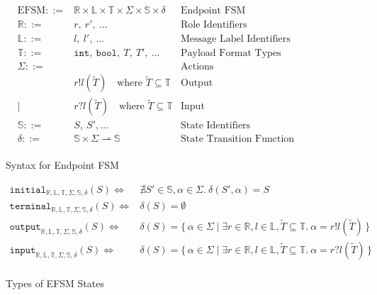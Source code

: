 \begin{figure}[!hb]
\doublespacing
\[
\begin{array}{rlr}

\text{EFSM} ::= & \mathbb{R} \times \mathbb{L} \times \mathbb{T} \times \Sigma \times \mathbb{S} \times \delta & \text{Endpoint FSM} \\

\mathbb{R} ::= & r,~r',~\dots & \text{Role Identifiers} \\

\mathbb{L} ::= & l,~l',~\dots & \text{Message Label Identifiers} \\

\mathbb{T} ::= & \texttt{int},~\texttt{bool},~T,~T',~\dots & \text{Payload Format Types} \\

\Sigma ::= & & \text{Actions} \\
     & r!l(\tilde{T}) \quad \text{where } \tilde{T} \subseteq \mathbb{T} & \text{Output} \\
\mid & r?l(\tilde{T}) \quad \text{where } \tilde{T} \subseteq \mathbb{T} & \text{Input} \\

\mathbb{S} ::= & S,~S',\dots & \text{State Identifiers} \\

\delta ::= & \mathbb{S} \times \Sigma \rightharpoonup \mathbb{S} & \text{State Transition Function} \\

\end{array}
\]
\singlespacing
\caption{Syntax for Endpoint FSM}
\end{figure}

\begin{figure}[!hb]
\doublespacing
\[
\begin{array}{rl}

\texttt{initial}_{\mathbb{R}, \mathbb{L}, \mathbb{T}, \Sigma, \mathbb{S}, \delta}(S) \iff & \nexists S' \in \mathbb{S},\alpha \in \Sigma.~\delta(S',\alpha) = S \\
\texttt{terminal}_{\mathbb{R}, \mathbb{L}, \mathbb{T}, \Sigma, \mathbb{S}, \delta}(S) \iff & \delta(S) = \emptyset \\
\texttt{output}_{\mathbb{R}, \mathbb{L}, \mathbb{T}, \Sigma, \mathbb{S}, \delta}(S) \iff & \delta(S) = \{\,\alpha \in \Sigma \mid \exists r \in \mathbb{R}, l \in \mathbb{L}, \tilde{T} \subseteq{\mathbb{T}}.~\alpha = r!l(\tilde{T})\,\} \\
\texttt{input}_{\mathbb{R}, \mathbb{L}, \mathbb{T}, \Sigma, \mathbb{S}, \delta}(S) \iff & \delta(S) = \{\,\alpha \in \Sigma \mid \exists r \in \mathbb{R}, l \in \mathbb{L}, \tilde{T} \subseteq{\mathbb{T}}.~\alpha = r?l(\tilde{T})\,\} \\
\end{array}
\]
\singlespacing
\caption{Types of EFSM States}
\end{figure}
